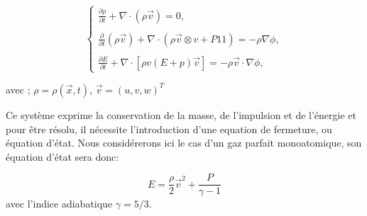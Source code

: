 \begin{equation}
\begin{cases}

{ \frac{ \partial \rho }{ \partial t } + \nabla \cdot (\rho \vec{v}) = 0}, \\
\\
{ \frac{ \partial }{ \partial t } (\rho \vec{v}) + \nabla \cdot (\rho \vec{v} \otimes v + P1\!\!1 )  = -\rho\nabla \phi }, \\
\\
{ \frac{ \partial E }{ \partial t } + \nabla \cdot [ \rho v (E+p)\vec{v} ] = -\rho \vec{v} \cdot \nabla \phi },

\end{cases}
\end{equation}
\label{eq:hydro}

avec ;
$\rho = \rho(\vec{x},t)$,
$ \vec{v} = (u,v,w)^T$

Ce système exprime la conservation de la masse, de l'impulsion et de l'énergie et pour être résolu, il nécessite l'introduction d'une equation de fermeture, ou équation d'état.
Nous considérerons ici le cas d'un gaz parfait monoatomique, son équation d'état sera donc:

%
\begin{equation}
E = \frac{\rho}{2	}\vec{v}^2 + \frac{P}{\gamma -1}
\end{equation}
avec l'indice adiabatique $\gamma = 5/3$.





%



